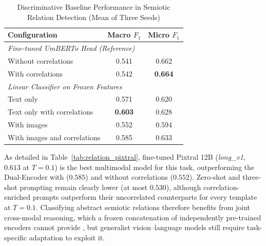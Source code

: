 \begin{table}[!t]
\centering
\caption{Discriminative Baseline Performance in Semiotic Relation Detection (Mean of Three Seeds)}
\label{tab:relation_baselines}
\footnotesize
\renewcommand{\arraystretch}{1.05}
\begin{tabular}{l c c}
\hline
\textbf{Configuration} & \textbf{Macro $F_1$} & \textbf{Micro $F_1$} \\
\hline
\multicolumn{3}{l}{\textit{Fine-tuned UmBERTo Head (Reference)}} \\
Without correlations & 0.541 & 0.662 \\
With correlations & 0.542 & \textbf{0.664} \\
\hline
\multicolumn{3}{l}{\textit{Linear Classifier on Frozen Features}} \\
Text only & 0.571 & 0.620 \\
Text only with correlations & \textbf{0.603} & 0.628 \\
With images & 0.552 & 0.594 \\
With images and correlations & 0.585 & 0.633 \\
\hline
\end{tabular}
\end{table}

As detailed in Table~\ref{tab:relation_pixtral}, fine-tuned Pixtral 12B (\textit{long\_v1}, $0.613$ at $T=0.1$) is the best multimodal model for this task, outperforming the Dual-Encoder with ($0.585$) and without correlations ($0.552$). Zero-shot and three-shot prompting remain clearly lower (at most $0.530$), although correlation-enriched prompts outperform their uncorrelated counterparts for every template at $T=0.1$. Classifying abstract semiotic relations therefore benefits from joint cross-modal reasoning, which a frozen concatenation of independently pre-trained encoders cannot provide \cite{radford2021clip, liang2022mindgap}, but generalist vision--language models still require task-specific adaptation to exploit it.

